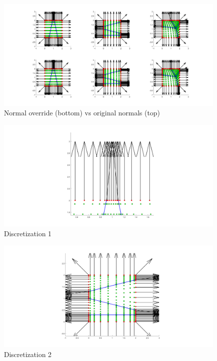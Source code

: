 \documentclass[11pt, a4paper]{article}
\theoremstyle{definition}
\begin{document}
	\begin{figure}[h]
		\centering
		\includegraphics[scale=0.4]{NormalsNotFixed.png}
		\caption{Normal override (bottom) vs original normals (top)} 
		\label{F1}
	\end{figure}
\begin{figure}[h]
	\centering
	\includegraphics[scale=0.4]{F1.png}
	\caption{Discretization 1} 
	\label{F1a}
\end{figure}
\begin{figure}[h]
	\centering
	\includegraphics[scale=0.4]{F2.png}
	\caption{Discretization 2} 
	\label{F1b}
\end{figure}
\end{document}

